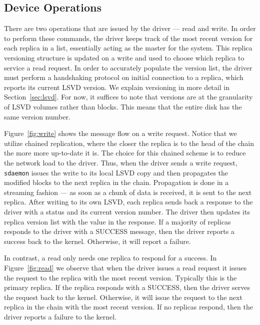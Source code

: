 \subsection{Device Operations}
\label{sec:readwrite}
There are two operations that are issued by the driver --- read and write.
In order to perform these commands, the driver keeps track of the most 
recent version for each replica in a list, essentially acting as the master
for the system. This replica versioning structure is updated on a write and 
used to choose which replica to service a read request. In order to 
accurately populate the version list, the driver must perform a handshaking 
protocol on initial connection to a replica, which reports its current LSVD
version. We explain versioning in more detail in Section~\ref{sec:lsvd}. For 
now, it suffices to note that versions are at the granularity of LSVD
volumes rather than blocks. This means that the entire disk has the same 
version number. 

Figure~\ref{fig:write} shows the message flow on a write request. Notice
that we utilize chained replication, where the closer the replica is to the 
head of the chain the more more up-to-date it is. The choice for this chained
scheme is to reduce the network load to the driver. Thus, when 
the driver sends a write request, \texttt{sdaemon} issues the write to its 
local LSVD copy and then propagates the modified blocks to the next replica 
in the chain. Propagation is done in a streaming fashion --- as soon as a 
chunk of data is received, it is sent to the next replica. After writing to 
its own LSVD, each replica sends back a 
response to the driver with a status and its current version number. The 
driver then updates its replica version list with the value in the response. 
If a majority of replicas responds to the driver with a SUCCESS message, 
then the driver reports a success back to the kernel. Otherwise, it will 
report a failure. 

In contrast, a read only needs one replica to respond for a success. In 
Figure~\ref{fig:read} we observe that when the driver issues a read request 
it issues the request to the replica with the most recent version. Typically 
this is the primary replica. If the replica responds with a SUCCESS, then 
the driver serves the request back to the kernel. Otherwise, it will issue 
the request to the next replica in the chain with the most recent version. 
If no replicas respond, then the driver reports a failure to the kernel.

